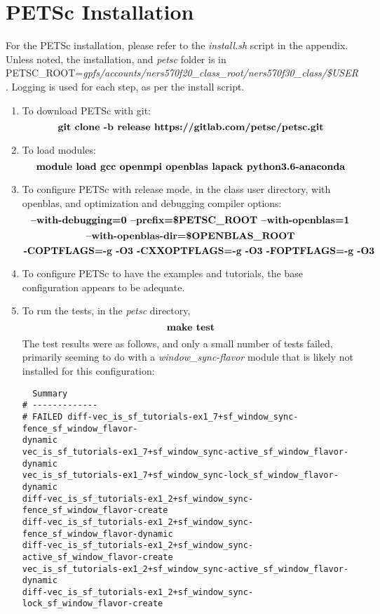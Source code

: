 \documentclass[12pt,letterpaper]{article}
\title{\large \doctitle}
\author{}
\date{}%
\newcommand{\exe}{PETSc }
\newcommand{\cmd}[1]{$$\textrm{\textbf{#1}}$$}
\newcommand{\dir}{\textit{petsc }}
\begin{document}
\maketitle
\thispagestyle{fancy}
\singlespacing

\section{\exe Installation}
For the \exe installation, please refer to the \textit{install.sh} script in the appendix. Unless noted, the installation, and \dir folder is in PETSC\_ROOT=\textit{gpfs/accounts/ners570f20\_class\_root/ners570f30\_class/\$USER}. Logging is used for each step, as per the install script.
\begin{enumerate}
  \item To download \exe with git: \cmd{git clone -b release https://gitlab.com/petsc/petsc.git}
  \item To load modules: \cmd{module load gcc openmpi openblas lapack python3.6-anaconda}
  \item To configure \exe with release mode, in the class user directory, with openblas, and optimization and debugging compiler options:
  \cmd{--with-debugging=0 --prefix=\$PETSC\_ROOT --with-openblas=1}
  \cmd{--with-openblas-dir=\$OPENBLAS\_ROOT}
  \cmd{-COPTFLAGS=-g -O3 -CXXOPTFLAGS=-g -O3 -FOPTFLAGS=-g -O3}
  \item To configure \exe to have the examples and tutorials, the base configuration appears to be adequate.
  \item To run the tests, in the \dir directory,
  \cmd{make test}
  The test results were as follows, and only a small number of tests failed, primarily seeming to do with a \textit{window\_sync-flavor} module that is likely not installed for this configuration:
  \begin{verbatim}
  Summary
# -------------
# FAILED diff-vec_is_sf_tutorials-ex1_7+sf_window_sync-fence_sf_window_flavor-
dynamic  
vec_is_sf_tutorials-ex1_7+sf_window_sync-active_sf_window_flavor-dynamic
vec_is_sf_tutorials-ex1_7+sf_window_sync-lock_sf_window_flavor-dynamic 
diff-vec_is_sf_tutorials-ex1_2+sf_window_sync-fence_sf_window_flavor-create 
diff-vec_is_sf_tutorials-ex1_2+sf_window_sync-fence_sf_window_flavor-dynamic 
diff-vec_is_sf_tutorials-ex1_2+sf_window_sync-active_sf_window_flavor-create 
vec_is_sf_tutorials-ex1_2+sf_window_sync-active_sf_window_flavor-dynamic 
diff-vec_is_sf_tutorials-ex1_2+sf_window_sync-lock_sf_window_flavor-create 

\end{verbatim}
\end{enumerate}
\end{document}
